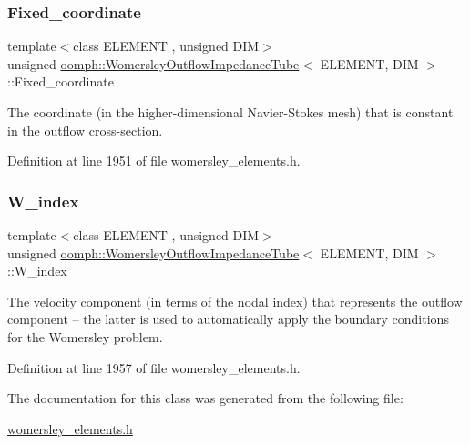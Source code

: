 \subsubsection{\texorpdfstring{Fixed\+\_\+coordinate}{Fixed\_coordinate}}
{\footnotesize\ttfamily template$<$class E\+L\+E\+M\+E\+NT , unsigned D\+IM$>$ \\
unsigned \hyperlink{classoomph_1_1WomersleyOutflowImpedanceTube}{oomph\+::\+Womersley\+Outflow\+Impedance\+Tube}$<$ E\+L\+E\+M\+E\+NT, D\+IM $>$\+::Fixed\+\_\+coordinate\hspace{0.3cm}{\ttfamily [private]}}



The coordinate (in the higher-\/dimensional Navier-\/\+Stokes mesh) that is constant in the outflow cross-\/section. 



Definition at line 1951 of file womersley\+\_\+elements.\+h.

\mbox{\label{classoomph_1_1WomersleyOutflowImpedanceTube_ab695df8342d00c65a16d79af35c49ad1}} 
\subsubsection{\texorpdfstring{W\+\_\+index}{W\_index}}
{\footnotesize\ttfamily template$<$class E\+L\+E\+M\+E\+NT , unsigned D\+IM$>$ \\
unsigned \hyperlink{classoomph_1_1WomersleyOutflowImpedanceTube}{oomph\+::\+Womersley\+Outflow\+Impedance\+Tube}$<$ E\+L\+E\+M\+E\+NT, D\+IM $>$\+::W\+\_\+index\hspace{0.3cm}{\ttfamily [private]}}



The velocity component (in terms of the nodal index) that represents the outflow component -- the latter is used to automatically apply the boundary conditions for the Womersley problem. 



Definition at line 1957 of file womersley\+\_\+elements.\+h.



The documentation for this class was generated from the following file\+:\begin{DoxyCompactItemize}
\item 
\hyperlink{womersley__elements_8h}{womersley\+\_\+elements.\+h}\end{DoxyCompactItemize}
